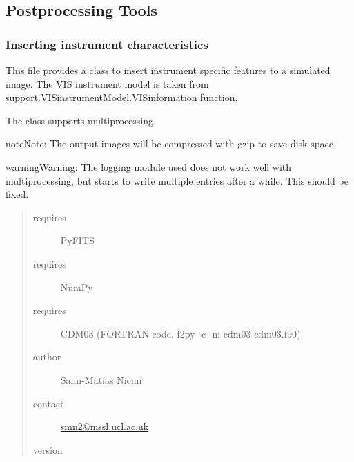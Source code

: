 \documentclass[a4paper,11pt,english]{sphinxmanual}
\begin{document}
\subsection{Postprocessing Tools}
\label{postproc:postprocessing-tools}\label{postproc::doc}\label{postproc:module-postproc.postprocessing}

\subsubsection{Inserting instrument characteristics}
\label{postproc:inserting-instrument-characteristics}
This file provides a class to insert instrument specific features to a simulated image. The VIS instrument
model is taken from support.VISinstrumentModel.VISinformation function.

The class supports multiprocessing.

\begin{notice}{note}{Note:}
The output images will be compressed with gzip to save disk space.
\end{notice}

\begin{notice}{warning}{Warning:}
The logging module used does not work well with multiprocessing, but
starts to write multiple entries after a while. This should be fixed.
\end{notice}
\begin{quote}\begin{description}
\item[{requires}] \leavevmode
PyFITS

\item[{requires}] \leavevmode
NumPy

\item[{requires}] \leavevmode
CDM03 (FORTRAN code, f2py -c -m cdm03 cdm03.f90)

\item[{author}] \leavevmode
Sami-Matias Niemi

\item[{contact}] \leavevmode
\href{mailto:smn2@mssl.ucl.ac.uk}{smn2@mssl.ucl.ac.uk}

\item[{version}] 

\end{description}\end{quote}
\end{document}

